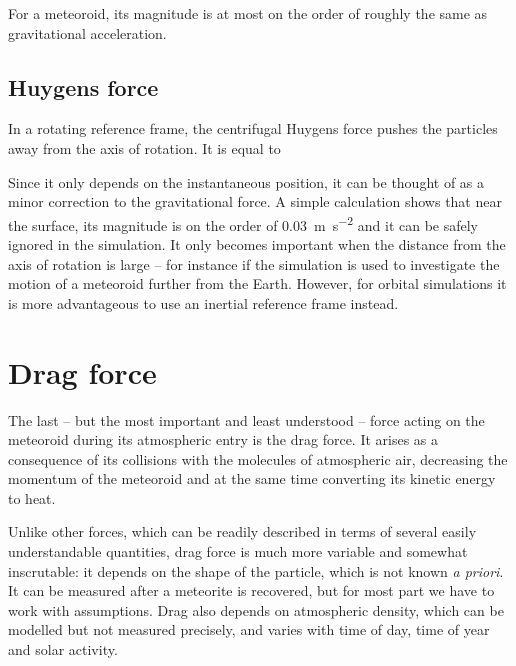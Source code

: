         For a meteoroid, its magnitude is at most on the order of
        roughly the same as gravitational acceleration.

    \subsection{Huygens force} \label{dfH}
        In a rotating reference frame, the centrifugal Huygens force pushes
        the particles away from the axis of rotation. It is equal to

        Since it only depends on the instantaneous position, it can be thought of as a minor correction to the
        gravitational force. A simple calculation shows that near the surface, its magnitude is on the order
        of \SI{0.03}{\metre\per\second\squared} and it can be safely ignored in the simulation.
        It only becomes important when the distance from the axis of rotation is large -- for
        instance if the simulation is used to investigate the motion of a meteoroid further from the Earth.
        However, for orbital simulations it is more advantageous to use an inertial reference frame instead.

\section{Drag force} \label{fd}
        The last -- but the most important and least understood -- force acting on the meteoroid during
        its atmospheric entry is the drag force. It arises as a consequence of its collisions with
        the molecules of atmospheric air, decreasing the momentum of the meteoroid and at the
        same time converting its kinetic energy to heat.

        Unlike other forces, which can be readily described in terms of several easily understandable
        quantities, drag force is much more variable and somewhat inscrutable: it depends on the shape
        of the particle, which is not known \textit{a priori}. It can be measured after
        a meteorite is recovered, but for most part we have to work with assumptions.
        Drag also depends on atmospheric density, which can be modelled but not measured precisely,
        and varies with time of day, time of year and solar activity.

